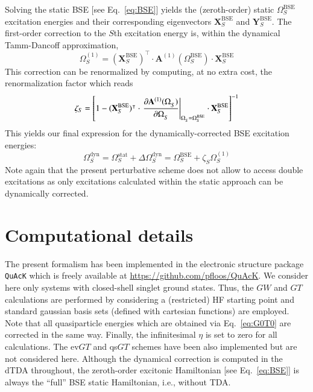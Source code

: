 \documentclass[aip,jcp,reprint,noshowkeys,superscriptaddress]{revtex4-1}
\newcommand{\T}[1]{#1^{\intercal}}
\newcommand{\BSE}{\text{BSE}}
\newcommand{\Om}[2]{\Omega_{#1}^{#2}}
\newcommand{\bA}[2]{\mathbf{A}_{#1}^{#2}}
\newcommand{\bX}[2]{\mathbf{X}_{#1}^{#2}}
\newcommand{\bY}[2]{\mathbf{Y}_{#1}^{#2}}
\begin{document}
Solving the static BSE [see Eq.~\eqref{eq:BSE}] yields the (zeroth-order) static $\Om{S}{\BSE}$ excitation energies and their corresponding eigenvectors $\bX{S}{\BSE}$ and $\bY{S}{\BSE}$. 
The first-order correction to the $S$th excitation energy is, within the dynamical Tamm-Dancoff approximation,
\begin{equation}
\label{eq:Om1-TDA}
	\Om{S}{(1)} = \T{(\bX{S}{\BSE})} \cdot \bA{}{(1)}(\Om{S}{\BSE}) \cdot \bX{S}{\BSE}
\end{equation}
This correction can be renormalized by computing, at no extra cost, the renormalization factor which reads
\begin{equation}
\label{eq:Z}
	\zeta_{S} = \qty[ 1 - \T{(\bX{S}{\BSE})} \cdot \left. \pdv{\bA{}{(1)}(\Om{S}{})}{\Om{S}{}} \right|_{\Om{S}{} = \Om{S}{\BSE}} \cdot \bX{S}{\BSE} ]^{-1}
\end{equation}
This yields our final expression for the dynamically-corrected BSE excitation energies:
\begin{equation}
	\Om{S}{\text{dyn}} = \Om{S}{\text{stat}} + \Delta\Om{S}{\text{dyn}} = \Om{S}{\BSE} + \zeta_{S} \Om{S}{(1)}
\end{equation}
Note again that the present perturbative scheme does not allow to access double excitations as only excitations calculated within the static approach can be dynamically corrected.

\section{Computational details}
\label{sec:compdet}
The present formalism has been implemented in the electronic structure package \texttt{QuAcK} \cite{QuAcK} which is freely available at \url{https://github.com/pfloos/QuAcK}. 
We consider here only systems with closed-shell singlet ground states. 
Thus, the $GW$ and $GT$ calculations are performed by considering a (restricted) HF starting point and standard gaussian basis sets (defined with cartesian functions) are employed.
Note that all quasiparticle energies which are obtained via Eq.~\eqref{eq:G0T0} are corrected in the same way.
Finally, the infinitesimal $\eta$ is set to zero for all calculations.
The ev$GT$ and qs$GT$ schemes have been also implemented but are not considered here.
Although the dynamical correction is computed in the dTDA throughout, the zeroth-order excitonic Hamiltonian [see Eq.~\eqref{eq:BSE}] is always the ``full'' BSE static Hamiltonian, i.e., without TDA. 
\end{document}
